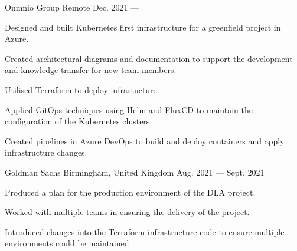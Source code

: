 

\begin{cventries}

    {Onmnio Group}
    {Remote}
    {Dec. 2021 — }
    {
        \begin{cvitems}
        \item{Designed and built Kubernetes first infrastructure for a greenfield project in Azure.}
        \item{Created architectural diagrams and documentation to support the development and knowledge transfer for new team members.}
        \item{Utilised Terraform to deploy infrastucture.}
        \item{Applied GitOps techniques using Helm and FluxCD to maintain the configuration of the Kubernetes clusters.}
        \item{Created pipelines in Azure DevOps to build and deploy containers and apply infrastructure changes.}
        \end{cvitems}
    }
    {Goldman Sachs}
    {Birmingham, United Kingdom}
    {Aug. 2021 — Sept. 2021}
    {
        \begin{cvitems}
        \item{Produced a plan for the production environment of the DLA project.}
        \item{Worked with multiple teams in ensuring the delivery of the project.}
        \item{Introduced changes into the Terraform infrastructure code to ensure multiple environments could be maintained.}
        \end{cvitems}
    }


\end{cventries}
